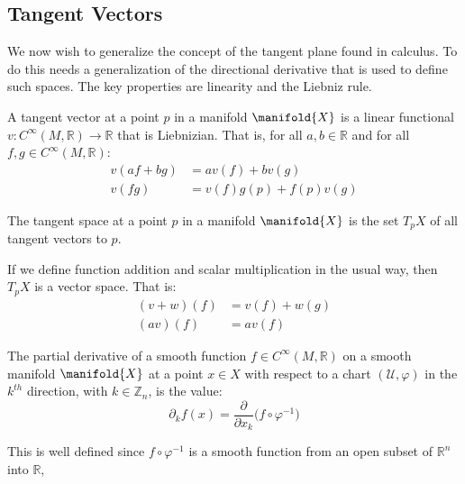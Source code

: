     \subsection{Tangent Vectors}
        We now wish to generalize the concept of the tangent plane found in
        calculus. To do this needs a generalization of the directional
        derivative that is used to define such spaces. The key properties
        are linearity and the Liebniz rule.
        \begin{definition}
            A tangent vector at a point $p$ in a manifold $\manifold{X}$ is
            a linear functional
            $v:C^{\infty}(M,\mathbb{R})\rightarrow\mathbb{R}$ that is
            Liebnizian. That is, for all $a,b\in\mathbb{R}$ and for all
            $f,g\in{C}^{\infty}(M,\mathbb{R})$:
            \begin{align}
                v(af+bg)&=av(f)+bv(g)\tag{Linearity}\\
                v(fg)&=v(f)g(p)+f(p)v(g)\tag{Liebnizian}
            \end{align}
        \end{definition}
        \begin{definition}
            The tangent space at a point $p$ in a manifold $\manifold{X}$
            is the set $T_{p}X$ of all tangent vectors to $p$.
        \end{definition}
        If we define function addition and scalar multiplication in the
        usual way, then $T_{p}X$ is a vector space. That is:
        \begin{align}
            (v+w)(f)&=v(f)+w(g)\\
            (av)(f)&=av(f)
        \end{align}
        \begin{definition}
            The partial derivative of a smooth function
            $f\in{C}^{\infty}(M,\mathbb{R})$ on a smooth manifold
            $\manifold{X}$ at a point $x\in{X}$ with respect to a chart
            $(\mathcal{U},\varphi)$ in the $k^{th}$ direction, with
            $k\in\mathbb{Z}_{n}$, is the value:
            \begin{equation}
                \partial_{k}f(x)=
                    \frac{\partial}{\partial{x}_{k}}
                    \Big(f\circ\varphi^{\minus{1}}\Big)
            \end{equation}
        \end{definition}
        This is well defined since $f\circ\varphi^{\minus{1}}$ is a smooth
        function from an open subset of $\mathbb{R}^{n}$ into $\mathbb{R}$,
